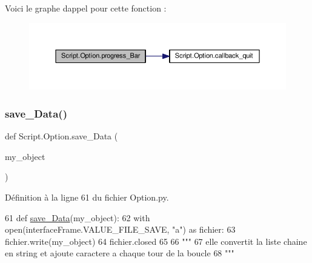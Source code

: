 Voici le graphe d\textquotesingle{}appel pour cette fonction \+:\nopagebreak
\begin{figure}[H]
\begin{center}
\leavevmode
\includegraphics[width=350pt]{namespaceScript_1_1Option_aff91639f98fde0463987ea08e565da05_cgraph}
\end{center}
\end{figure}
\mbox{\label{namespaceScript_1_1Option_a09506d9cf0343fc80883c5db0a207737}} 
\subsubsection{\texorpdfstring{save\+\_\+\+Data()}{save\_Data()}}
{\footnotesize\ttfamily def Script.\+Option.\+save\+\_\+\+Data (\begin{DoxyParamCaption}\item[{}]{my\+\_\+object }\end{DoxyParamCaption})}



Définition à la ligne 61 du fichier Option.\+py.


\begin{DoxyCode}
61 \textcolor{keyword}{def }\hyperlink{namespaceScript_1_1Option_a09506d9cf0343fc80883c5db0a207737}{save\_Data}(my\_object):
62     with open(interfaceFrame.VALUE\_FILE\_SAVE, \textcolor{stringliteral}{"a"}) \textcolor{keyword}{as} fichier:  
63         fichier.write(my\_object)
64         fichier.closed
65 
66 \textcolor{stringliteral}{"""
}
67 \textcolor{stringliteral}{elle convertit la liste chaine en string et ajoute caractere a chaque tour de la boucle
}
68 \textcolor{stringliteral}{"""}
\end{DoxyCode}
\mbox{\label{namespaceScript_1_1Option_ac71533bc42f23543f3c564ccf01d9faf}} 
